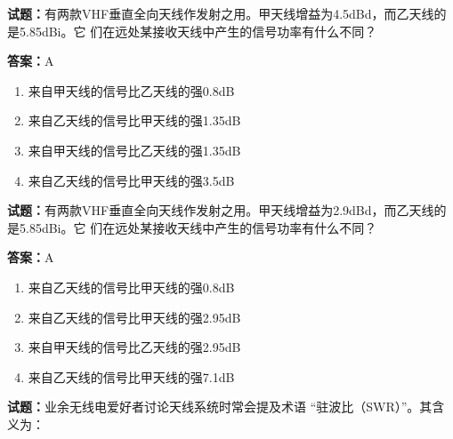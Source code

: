 \documentclass{ctexbook}
\begin{document}




\vspace{1em}

\textbf{试题：}有两款VHF垂直全向天线作发射之用。甲天线增益为4.5dBd，而乙天线的是5.85dBi。它
们在远处某接收天线中产生的信号功率有什么不同？ 

\textbf{答案：}A 

\begin{enumerate}[leftmargin=3em]
  \item 来自甲天线的信号比乙天线的强0.8dB 

  \item 来自乙天线的信号比甲天线的强1.35dB 

  \item 来自甲天线的信号比乙天线的强1.35dB 

  \item 来自乙天线的信号比甲天线的强3.5dB 

\end{enumerate}





\vspace{1em}

\textbf{试题：}有两款VHF垂直全向天线作发射之用。甲天线增益为2.9dBd，而乙天线的是5.85dBi。它
们在远处某接收天线中产生的信号功率有什么不同？ 

\textbf{答案：}A 

\begin{enumerate}[leftmargin=3em]
  \item 来自乙天线的信号比甲天线的强0.8dB 

  \item 来自乙天线的信号比甲天线的强2.95dB 

  \item 来自甲天线的信号比乙天线的强2.95dB 

  \item 来自乙天线的信号比甲天线的强7.1dB 

\end{enumerate}





\vspace{1em}

\textbf{试题：}业余无线电爱好者讨论天线系统时常会提及术语 “驻波比（SWR）”。其含义为： 
\end{document}
